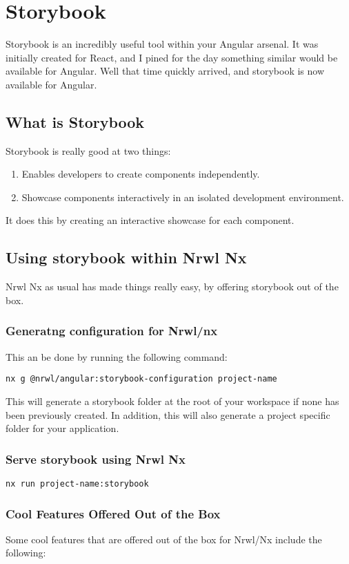 \chapter{Storybook}
Storybook is an incredibly useful tool within your Angular arsenal. It was initially created for React, and I pined for the day something similar would be available for Angular. Well that time quickly arrived, and storybook is now available for Angular. 

\section{What is Storybook}
Storybook is really good at two things:
\begin{enumerate}
  \item Enables developers to create components independently. 
  \item Showcase components interactively in an isolated development environment.
\end{enumerate}

It does this by creating an interactive showcase for each component. 

\section{Using storybook within Nrwl Nx}
Nrwl Nx as usual has made things really easy, by offering storybook out of the box. 

\subsection{Generatng configuration for Nrwl/nx}
This an be done by running the following command: 
\begin{verbatim}
nx g @nrwl/angular:storybook-configuration project-name
\end{verbatim}

This will generate a storybook folder at the root of your workspace if none has been previously created. In addition, this will also generate a project specific folder for your application. 

\subsection{Serve storybook using Nrwl Nx}
\begin{verbatim}
nx run project-name:storybook  
\end{verbatim}

\subsection{Cool Features Offered Out of the Box}
Some cool features that are offered out of the box for Nrwl/Nx include the following: 
\begin{verbatim}
  
\end{verbatim}


